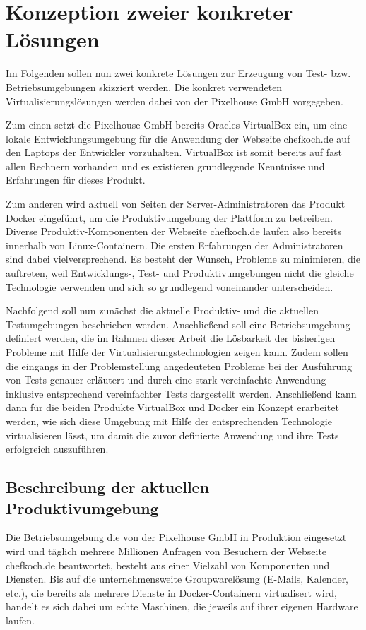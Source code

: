 \section{Konzeption zweier konkreter Lösungen}

Im Folgenden sollen nun zwei konkrete Lösungen zur Erzeugung von Test- bzw. Betriebsumgebungen skizziert werden. Die konkret verwendeten Virtualisierungslösungen werden dabei von der Pixelhouse GmbH vorgegeben.

Zum einen setzt die Pixelhouse GmbH bereits Oracles VirtualBox ein, um eine lokale Entwicklungsumgebung für die Anwendung der Webseite chefkoch.de auf den Laptops der Entwickler vorzuhalten. VirtualBox ist somit bereits auf fast allen Rechnern vorhanden und es existieren grundlegende Kenntnisse und Erfahrungen für dieses Produkt.

Zum anderen wird aktuell von Seiten der Server-Administratoren das Produkt Docker eingeführt, um die Produktivumgebung der Plattform zu betreiben. Diverse Produktiv-Komponenten der Webseite chefkoch.de laufen also bereits innerhalb von Linux-Containern. Die ersten Erfahrungen der Administratoren sind dabei vielversprechend. Es besteht der Wunsch, Probleme zu minimieren, die auftreten, weil Entwicklungs-, Test- und Produktivumgebungen nicht die gleiche Technologie verwenden und sich so grundlegend voneinander unterscheiden.

Nachfolgend soll nun zunächst die aktuelle Produktiv- und die aktuellen Testumgebungen beschrieben werden. Anschließend soll eine Betriebsumgebung definiert werden, die im Rahmen dieser Arbeit die Lösbarkeit der bisherigen Probleme mit Hilfe der Virtualisierungstechnologien zeigen kann. Zudem sollen die eingangs in der Problemstellung angedeuteten Probleme bei der Ausführung von Tests genauer erläutert und durch eine stark vereinfachte Anwendung inklusive entsprechend vereinfachter Tests dargestellt werden. Anschließend kann dann für die beiden Produkte VirtualBox und Docker ein Konzept erarbeitet werden, wie sich diese Umgebung mit Hilfe der entsprechenden Technologie virtualisieren lässt, um damit die zuvor definierte Anwendung und ihre Tests erfolgreich auszuführen.

\subsection{Beschreibung der aktuellen Produktivumgebung}

Die Betriebsumgebung die von der Pixelhouse GmbH in Produktion eingesetzt wird und täglich mehrere Millionen Anfragen von Besuchern der Webseite chefkoch.de beantwortet, besteht aus einer Vielzahl von Komponenten und Diensten. Bis auf die unternehmensweite Groupwarelösung (E-Mails, Kalender, etc.), die bereits als mehrere Dienste in Docker-Containern virtualisert wird, handelt es sich dabei um echte Maschinen, die jeweils auf ihrer eigenen Hardware laufen.

